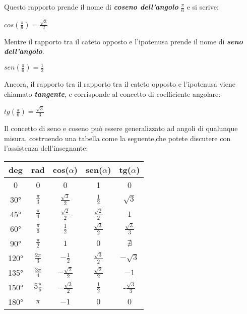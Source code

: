 Questo rapporto prende il nome di {\bf \slshape coseno dell'angolo} $\frac \pi 6$ e si scrive:
\begin{center}
\begin{math}
cos(\frac \pi 6) = \frac {\sqrt 3} 2
\end{math}
\end{center}
Mentre il rapporto tra il cateto opposto e l'ipotenusa prende il nome di {\bfseries \slshape seno dell'angolo}.
\begin{center}
\begin{math}
sen(\frac \pi 6) = \frac 1 2
\end{math}
\end{center}
Ancora, il rapporto tra il rapporto tra il cateto opposto e l'ipotenusa viene chiamato {\bf \slshape tangente}, e corrisponde al concetto di coefficiente angolare:
\begin{center}
\begin{math}
tg(\frac \pi 6) = \frac {\sqrt 3} 3
\end{math}
\end{center}
Il concetto di seno e coseno può essere generalizzato ad angoli di qualunque misura, costruendo una tabella come la seguente,che potete discutere con l'assistenza dell'insegnante:\newline
\begin{center}
\begin{tabular}{|c|c|c|c|c|}
\hline
deg & rad & cos($\alpha$) & sen($\alpha$) & tg($\alpha$) \\
\hline
0 & 0 & 0 & 1 & 0 \\
\hline
30° & $\frac \pi 3$ & $\frac {\sqrt 3} 2$ & $\frac 1 2$ & $\sqrt 3$ \\
\hline
45° & $\frac \pi 4$ & $\frac {\sqrt 2} 2$ & $\frac {\sqrt 2} 2$ & $1$ \\
\hline
60° & $\frac \pi 6$ & $\frac 1 2$ & $\frac {\sqrt 3} 2$ & $\frac {\sqrt 3} 3$ \\
\hline
90° & $\frac \pi 2$ & $1$ & $0$ & $\nexists$ \\
\hline
120° & $\frac {2 \pi} 3$ & $-\frac 1 2$ & $\frac {\sqrt 3} {2}$ & $-\sqrt 3$ \\
\hline
135° & $\frac {3 \pi} 4$ & $-\frac {\sqrt 2} 2$ & $\frac {\sqrt 2} {2}$ & $-1$ \\
\hline
150° & $5 \frac \pi 6$ & $-\frac {\sqrt 3} 2$ & $\frac 1 2$ & -$\frac {\sqrt 3} {3}$ \\
\hline
180° & $\pi $ & $-1$ & $0$ & $0$ \\
\hline
\end{tabular}
\end{center}

